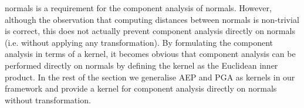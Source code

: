 normals is a requirement for the component analysis of normals. However,
although the observation that computing distances between normals is non-trivial
is correct, this does not actually prevent component analysis directly on
normals (i.e. without applying any transformation). By formulating the component
analysis in terms of a kernel, it becomes obvious that component analysis can be
performed directly on normals by defining the kernel as the Euclidean inner
product. In the rest of the section we generalise AEP and PGA as kernels in our
framework and provide a kernel for component analysis directly on normals
without transformation.


